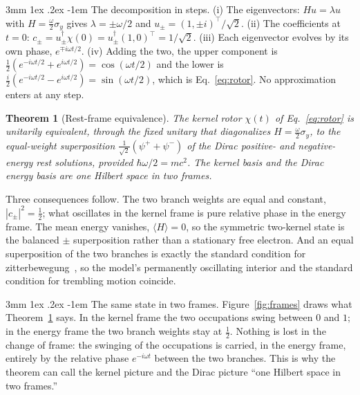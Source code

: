 \documentclass[%
 reprint, amsmath,amssymb, aps, prb, ]{revtex4-2}
\makeatletter
\numberwithin{equation}{section}
\newtheorem{theorem}{Theorem}[section]
\renewcommand\paragraph{%
  \@startsection{paragraph}{4}{\z@}%
    {3mm \@plus 1ex \@minus .2ex}%
    {-1em}%
    {\normalfont\normalsize\itshape}}
\makeatother
\begin{document}
\paragraph{The decomposition in steps.} (i) The eigenvectors: $H u=\lambda u$ with $H=\tfrac{\omega}{2}\sigma_y$ gives $\lambda=\pm\omega/2$ and $u_\pm=(1,\pm i)^\top/\sqrt2$. (ii) The coefficients at $t=0$: $c_\pm=u_\pm^\dagger\chi(0)=u_\pm^\dagger(1,0)^\top=1/\sqrt2$. (iii) Each eigenvector evolves by its own phase, $e^{\mp i\omega t/2}$. (iv) Adding the two, the upper component is $\tfrac12(e^{-i\omega t/2}+e^{i\omega t/2})=\cos(\omega t/2)$ and the lower is $\tfrac{i}{2}(e^{-i\omega t/2}-e^{i\omega t/2})=\sin(\omega t/2)$, which is Eq.~\eqref{eq:rotor}. No approximation enters at any step.

\begin{theorem}[Rest-frame equivalence]
\label{thm:equiv}
The kernel rotor $\chi(t)$ of Eq.~\eqref{eq:rotor} is unitarily equivalent, through the fixed unitary that diagonalizes $H=\tfrac{\omega}{2}\sigma_y$, to the equal-weight superposition $\tfrac{1}{\sqrt2}(\psi^{+}+\psi^{-})$ of the Dirac positive- and negative-energy rest solutions, provided $\hbar\omega/2=mc^2$. The kernel basis and the Dirac energy basis are one Hilbert space in two frames.
\end{theorem}

Three consequences follow. The two branch weights are equal and constant, $|c_\pm|^2=\tfrac12$; what oscillates in the kernel frame is pure relative phase in the energy frame. The mean energy vanishes, $\langle H\rangle=0$, so the symmetric two-kernel state is the balanced $\pm$ superposition rather than a stationary free electron. And an equal superposition of the two branches is exactly the standard condition for zitterbewegung~\cite{ref:schrodinger,ref:thaller}, so the model's permanently oscillating interior and the standard condition for trembling motion coincide.

\paragraph{The same state in two frames.} Figure~\ref{fig:frames} draws what Theorem~\ref{thm:equiv} says. In the kernel frame the two occupations swing between $0$ and $1$; in the energy frame the two branch weights stay at $\tfrac12$. Nothing is lost in the change of frame: the swinging of the occupations is carried, in the energy frame, entirely by the relative phase $e^{-i\omega t}$ between the two branches. This is why the theorem can call the kernel picture and the Dirac picture ``one Hilbert space in two frames.''
\end{document}
